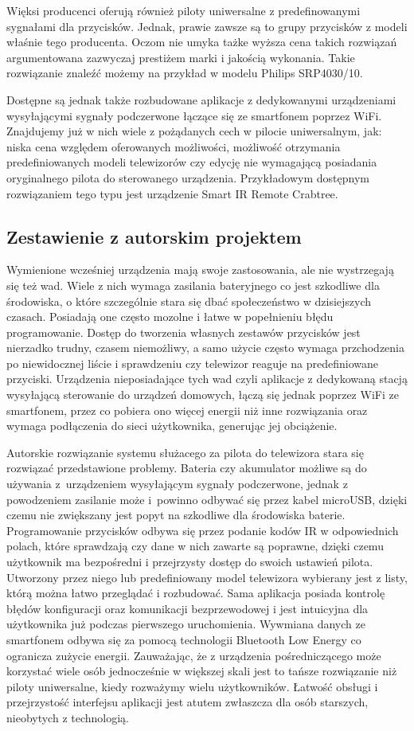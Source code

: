 \documentclass[12pt,twoside]{article}
\begin{document}
Więksi producenci oferują również piloty uniwersalne z predefinowanymi sygnałami dla przycisków. Jednak,
prawie zawsze są to grupy przycisków z modeli właśnie tego producenta. Oczom nie umyka tażke wyższa cena takich
rozwiązań argumentowana zazwyczaj prestiżem marki i jakością wykonania. Takie rozwiązanie znaleźć
możemy na przykład w modelu Philips SRP4030/10\cite{expensiveController}.

Dostępne są jednak także rozbudowane aplikacje z dedykowanymi urządzeniami wysyłającymi sygnały podczerwone łączące się ze smartfonem poprzez WiFi. Znajdujemy już w nich wiele z pożądanych cech w pilocie uniwersalnym, jak: niska cena względem oferowanych możliwości, możliwość otrzymania predefiniowanych modeli telewizorów czy edycję nie wymagającą posiadania oryginalnego pilota do sterowanego urządzenia. Przykładowym dostępnym rozwiązaniem tego typu jest urządzenie Smart IR Remote Crabtree\cite{appController}.
\subsection{Zestawienie z autorskim projektem}
{Wymienione wcześniej urządzenia mają swoje zastosowania, ale nie wystrzegają się też wad. Wiele z nich wymaga zasilania bateryjnego co jest szkodliwe dla środowiska, o które szczególnie stara się dbać społeczeństwo w dzisiejszych czasach. Posiadają one często mozolne i łatwe w popełnieniu błędu programowanie. Dostęp do tworzenia własnych zestawów przycisków jest nierzadko trudny, czasem niemożliwy, a samo użycie często wymaga przchodzenia po niewidocznej liście i sprawdzeniu czy telewizor reaguje na predefiniowane przyciski. Urządzenia nieposiadające tych wad czyli aplikacje z dedykowaną stacją wysyłającą sterowanie do urządzeń domowych, łączą się jednak poprzez WiFi ze smartfonem, przez co pobiera ono więcej energii niż inne rozwiązania oraz wymaga podłączenia do sieci użytkownika, generując jej obciążenie.

   Autorskie rozwiązanie systemu służacego za pilota do telewizora stara się rozwiązać przedstawione problemy. Bateria czy akumulator możliwe są do używania z~urządzeniem wysyłającym sygnały podczerwone, jednak z powodzeniem zasilanie może i~powinno odbywać się przez kabel microUSB, dzięki czemu nie zwiększany jest popyt na szkodliwe dla środowiska baterie. Programowanie przycisków odbywa się przez podanie kodów IR w odpowiednich polach, które sprawdzają czy dane w nich zawarte są poprawne, dzięki czemu użytkownik ma bezpośredni i przejrzysty dostęp do swoich ustawień pilota. Utworzony przez niego lub predefiniowany model telewizora wybierany jest z listy, którą można łatwo przeglądać i rozbudować. Sama aplikacja posiada kontrolę błędów konfiguracji oraz komunikacji bezprzewodowej i jest intuicyjna dla użytkownika już podczas pierwszego uruchomienia. Wywmiana danych ze smartfonem odbywa się za pomocą technologii Bluetooth Low Energy co ogranicza zużycie energii. Zauważając, że z urządzenia pośredniczącego może korzystać wiele osób jednocześnie w większej skali jest to tańsze rozwiązanie niż piloty uniwersalne, kiedy rozważymy wielu użytkowników. Łatwość obsługi i przejrzystość interfejsu aplikacji jest atutem zwłaszcza dla osób starszych, nieobytych z technologią.
}
\clearpage
\end{document}
